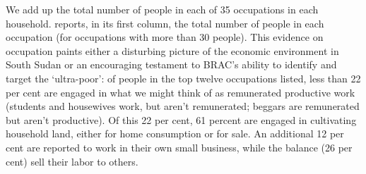 \documentclass[11pt]{article}
\begin{document}
We add up the total number of people in each of 35 occupations in each
household.  reports, in its first column, the total
number of people in each occupation (for occupations with more than 30
people).  This evidence on occupation paints either a disturbing
picture of the economic environment in South Sudan or an encouraging
testament to BRAC's ability to identify and target the `ultra-poor':
of people in the top twelve occupations listed, less than 22 per cent
are engaged in what we might think of as remunerated productive work
(students and housewives work, but aren't remunerated; beggars are
remunerated but aren't productive).  Of this 22 per cent, 61 percent
are engaged in cultivating household land, either for home consumption
or for sale.  An additional 12 per cent are reported to work in their
own small business, while the balance (26 per cent) sell their labor
to others.
\end{document}
